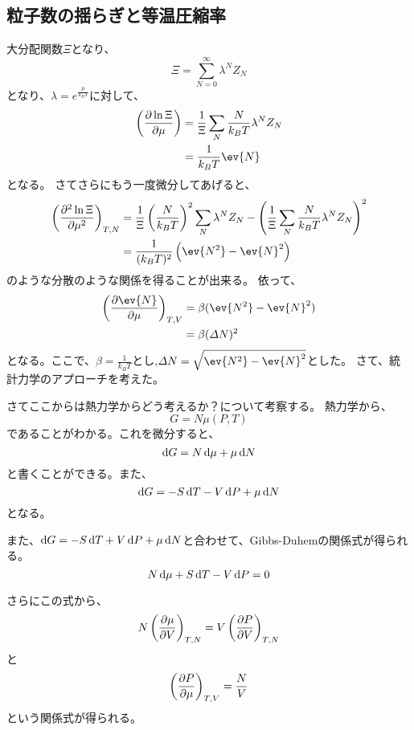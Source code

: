 \documentclass[titlepage]{ltjsarticle}
\begin{document}
\subsection{粒子数の揺らぎと等温圧縮率}
大分配関数\(\Xi\)となり、
\begin{equation}
  \Xi = \sum_{N=0}^{\infty}\lambda^N Z_N 
\end{equation}
となり、\(\lambda=e^{\frac{\mu}{k_BT}}\)に対して、
\begin{align}
  \left( \pdv{\ln \Xi}{\mu} \right) & = \frac{1}{\Xi} \sum_N \frac{N}{k_BT}\lambda^N Z_N\\
  & = \frac{1}{k_BT} \ev{N} 
\end{align}
となる。
さてさらにもう一度微分してあげると、
\begin{align}
  \left( \pdv[order=2]{\ln \Xi}{\mu} \right)_{T,N} &= \frac{1}{\Xi}\left( \frac{N}{k_BT} \right)^2 \sum_N \lambda^N Z_N - \left( \frac{1}{\Xi} \sum_N \frac{N}{k_BT}\lambda^N Z_N \right)^2\\
  & = \frac{1}{(k_BT)^2} \left( \ev{N^2} - \ev{N}^2 \right)
\end{align}
のような分散のような関係を得ることが出来る。
依って、
\begin{align}\label{eq:0.4}
  \left(\pdv{\ev{N}}{\mu}\right)_{T,V} & = \beta (\ev{N^2} - \ev{N}^2)\\
  & = \beta (\varDelta N)^2
\end{align}
となる。ここで、\(\beta = \frac{1}{k_BT}\)とし,\(\varDelta N = \sqrt{\ev{N^2} - \ev{N}^2}\)とした。
さて、統計力学のアプローチを考えた。

さてここからは熱力学からどう考えるか？について考察する。
熱力学から、
\begin{equation}
  G = N \mu(P,T)
\end{equation}
であることがわかる。これを微分すると、
\begin{equation}
  \odif{G} = N \odif{\mu} + \mu \odif{N}
\end{equation}
と書くことができる。また、
\begin{equation}
  \odif{G} = -S \odif{T} - V \odif{P} + \mu \odif{N}
\end{equation}
となる。

また、\(\odif{G}= -S \odif{T} +V \odif{P} + \mu \odif{N}\)と合わせて、Gibbs-Duhemの関係式が得られる。
\begin{equation}
  N \odif{\mu} + S \odif{T} - V \odif{P} = 0
\end{equation}

さらにこの式から、
\begin{equation}
  N \left( \pdv{\mu}{V} \right)_{T,N} =V\left( \pdv{P}{V} \right)_{T,N}
\end{equation}
と
\begin{equation}
  \left( \pdv{P}{\mu} \right)_{T,V} = \frac{N}{V}
\end{equation}
という関係式が得られる。
\end{document}
